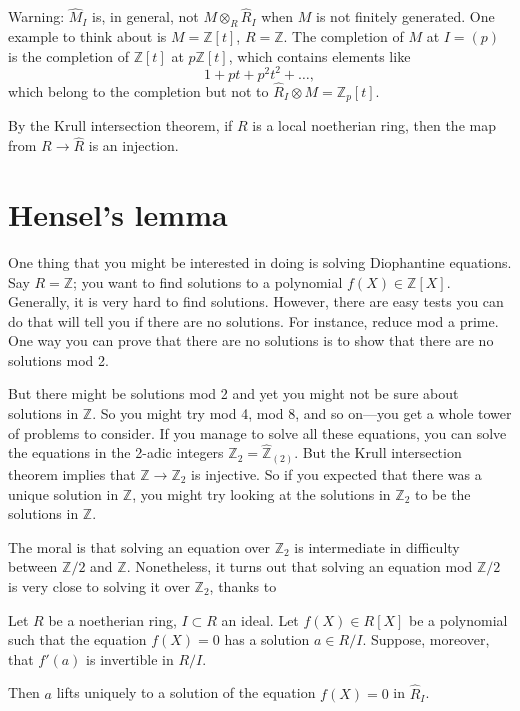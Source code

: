 \begin{remark} 
Warning: $\hat{M}_I$ is, in general, not $M \otimes_R \hat{R}_I$ when $M$ is
not finitely generated. One example to think about is $M  = \mathbb{Z}[t]$,
$R = \mathbb{Z}$. The
completion of $M$ at $I = (p)$ is the completion of $\mathbb{Z}[t]$ at $p
\mathbb{Z}[t]$, which contains elements like
\[ 1 + pt + p^2 t^2 + \dots,  \]
which belong to the completion but not to $\hat{R}_I \otimes M = \mathbb{Z}_p
[t]$. 
\end{remark} 

\begin{remark} 
By the Krull intersection theorem, if $R$ is a local noetherian ring, then the
map from $R \to \hat{R}$ is an injection.
\end{remark} 


\section{Hensel's lemma} One thing that you might be interested in doing is solving
Diophantine equations. Say $R = \mathbb{Z}$; you want to find solutions to a
polynomial $f(X) \in \mathbb{Z}[X]$. Generally, it is very hard to find
solutions. However, there are easy tests you can do that will tell you if there
are no solutions. For instance, reduce mod a prime. One way you can prove that
there are no solutions is to show that there are no solutions mod 2. 

But there might be solutions mod 2 and yet you might not be sure about
solutions in $\mathbb{Z}$. So you might try mod 4, mod 8, and so on---you get a
whole tower of problems to consider. If you manage to solve all these equations, you can solve the equations in the 2-adic integers $\mathbb{Z}_2 =
\hat{\mathbb{Z}}_{(2)}$.
But the Krull intersection theorem implies that $\mathbb{Z} \to \mathbb{Z}_2$
is injective. So if you expected that there was a unique solution in
$\mathbb{Z}$, you might try looking at the solutions in $\mathbb{Z}_2$ to be
the solutions in $\mathbb{Z}$.



The moral is that solving an equation over $\mathbb{Z}_2$ is intermediate in
difficulty between $\mathbb{Z}/2$ and $\mathbb{Z}$. Nonetheless, it turns out
that solving an equation mod $\mathbb{Z}/2$ is very close to solving it over
$\mathbb{Z}_2$, thanks to

\begin{theorem}
Let $R$ be a noetherian ring, $I \subset R$ an ideal. Let $f(X) \in R[X]$ be a
polynomial such that the equation $f(X)=0$ has a solution $ a \in R/I$.
Suppose, moreover, that $f'(a)$ is invertible in $R/I$. 

Then $a$ lifts uniquely to a solution of the equation $f(X) = 0$ in $\hat{R}_I$.
\end{theorem} 

